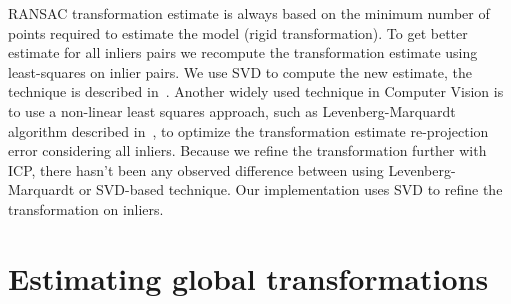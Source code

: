 \gls{RANSAC} transformation estimate is always based on the minimum number of points required to estimate the model (rigid transformation). To get better estimate for all inliers pairs we recompute the transformation estimate using least-squares on inlier pairs. We use \gls{SVD} to compute the new estimate, the technique is described in~\cite{golub1970svd}. Another widely used technique in Computer Vision is to use a non-linear least squares approach, such as Levenberg-Marquardt algorithm described in~\cite{more1978levmarq}, to optimize the transformation estimate re-projection error considering all inliers. Because we refine the transformation further with \gls{ICP}, there hasn't been any observed difference between using Levenberg-Marquardt or \gls{SVD}-based technique. Our implementation uses \gls{SVD} to refine the transformation on inliers.



\section{Estimating global transformations}
\label{sec:estimate-global}

